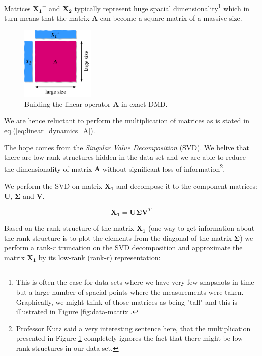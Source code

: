 \documentclass[10pt,twocolumn]{article}
\begin{document}
Matrices $\mathbf{X_1}^{+}$ and $\mathbf{X_2}$ typically represent huge spacial dimensionality\footnote{This is often the case for data sets where we have very few snapshots in time but a large number of spacial points where the measurements were taken. Graphically, we might think of those matrices as being "tall" and this is illustrated in Figure \ref{fig:data-matrix}.} which in turn means that the matrix $\mathbf{A}$ can become a square matrix of a massive size. 

\begin{figure}
\centering\includegraphics[width=3.5cm]{getting-A.png}
\caption{Building the linear operator $\mathbf{A}$ in exact DMD.}
\label{fig:building-A}
\end{figure}

We are hence reluctant to perform the multiplication of matrices as is stated in eq.(\ref{eq:linear_dynamics_A}). 

The hope comes from the \textit{Singular Value Decomposition} (SVD). We belive that there are low-rank structures hidden in the data set and we are able to reduce the dimensionality of matrix $\mathbf{A}$ without significant loss of information\footnote{Professor Kutz said a very interesting sentence here, that the multiplication presented in Figure \ref{fig:building-A} completely ignores the fact that there might be low-rank structures in our data set.}.

We perform the SVD on matrix $\mathbf{X_1}$ and decompose it to the component matrices: $\mathbf{U}$, $\mathbf{\Sigma}$ and $\mathbf{V}$.

\begin{equation} \label{eq:solution}
\mathbf{X_1} = \mathbf{U} \mathbf{\Sigma} \mathbf{V}^T 
\end{equation}

Based on the rank structure of the matrix $\mathbf{X_1}$ (one way to get information about the rank structure is to plot the elements from the diagonal of the matrix $\mathbf{\Sigma}$) we perform a rank-$r$ truncation on the SVD decomposition and approximate the matrix $\mathbf{X_1}$ by its low-rank (rank-$r$) representation:
\end{document}
